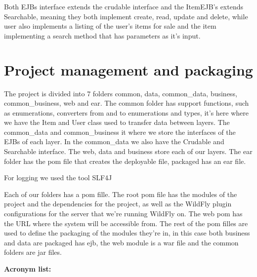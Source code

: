 \documentclass{article}
\begin{document}
\qquad Both \ac{EJB}s interface extends the crudable interface and the ItemEJB's extends Searchable, meaning they both implement create, read, update and delete, while user also implements a listing of the user's items for sale and the item implementing a search method that has parameters as it's input.




\section{Project management and packaging}

\qquad The project is divided into 7 folders common, data, common\_data, business, common\_business, web and ear. The common folder has support functions, such as enumerations, converters from and to enumerations and types, it's here where we have the Item and User class used to transfer data between layers. The common\_data and common\_business it where we store the interfaces of the \ac{EJB}s of each layer. In the common\_data we also have the Crudable and Searchable interface. The web, data and business store each of our layers. The ear folder has the pom file that creates the deployable file, packaged has an ear file.

\qquad For logging we used the tool \ac{SLF4J}

\qquad Each of our folders has a pom fille. The root pom file has the modules of the project and the dependencies for the project, as well as the WildFly plugin configurations for the server that we're running WildFly on. The web pom has the URL where the system will be accessible from. The rest of the pom filles are used to define the packaging of the modules they're in, in this case both business and data are packaged has ejb, the web module is a war file and the common folders are jar files.\newline\newline






\textbf{Acronym list:}

\begin{acronym}
\end{acronym}
\end{document}

